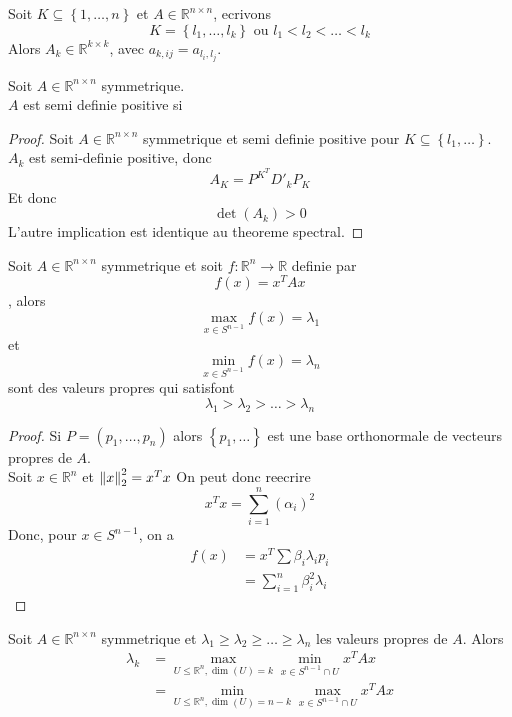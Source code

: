 \documentclass[../main.tex]{subfiles}
\begin{document}
\begin{defn}
Soit $K \subseteq \left\{ 1,\ldots,n \right\} $ et $A \in \mathbb{R}^{n\times n}$, ecrivons
\[ 
K = \left\{ l_1,\ldots, l_k \right\}  \text{ ou }  l_1 < l_2 < \ldots <l_k
\]
Alors $A_k \in \mathbb{R}^{k \times k}$, avec $a_{k,ij} = a_{l_i,l_j}  $.
\end{defn}
\begin{thm}
Soit $A \in \mathbb{R}^{n\times n}$ symmetrique.\\
$A$ est semi definie positive si 
\end{thm}
\begin{proof}
Soit $A \in \mathbb{R}^{n \times n} $ symmetrique et semi definie positive pour $K \subseteq \left\{ l_1,\ldots \right\} $.\\
$A_k$ est semi-definie positive, donc 
\[ 
A_K = P^{K^{T}} D'_k P_K
\]
Et donc
\[ 
	\det ( A_k) >0
\]
L'autre implication est identique au theoreme spectral.

\end{proof}
\begin{thm}
Soit $A \in \mathbb{R}^{n\times n}$ symmetrique et soit $f: \mathbb{R}^{n}\to \mathbb{R}$ definie par
\[ 
	f( x) = x^{T} A x
\]
, alors 
\[ 
	\max_{x \in S^{n-1}}  f(x)  = \lambda_1
\]
et
\[ 
	\min_{x \in S^{n-1}}  f(x)  = \lambda_n
\]
sont des valeurs propres qui satisfont
\[ 
\lambda_1 > \lambda_2 > \ldots > \lambda_n
\]


\end{thm}
\begin{proof}
	Si $P= ( p_1, \ldots, p_n) $ alors $ \left\{ p_1, \ldots \right\} $ est une base orthonormale de vecteurs propres de $A$. \\
	Soit $x \in \mathbb{R}^{n}$ et $ \left\lVert x\right\rVert _2^{2}=x^{T}x$ On peut donc reecrire
	\[ 
		x^{T}x = \sum_{i=1}^{ n} ( \alpha_i) ^{2}
	\]
	Donc, pour $x \in S^{n-1}$, on a
	\begin{align*}
		f( x) &= x^{T} \sum \beta_i \lambda_i p_i\\
		&= \sum_{i=1}^{ n}\beta_i ^{2} \lambda_i
	\end{align*}
	
	
\end{proof}
\begin{thm}
	Soit $A \in \mathbb{R}^{n\times n}$ symmetrique et $\lambda_1 \geq \lambda_2 \geq \ldots \geq \lambda_n$ les valeurs propres de $A$. Alors
	\begin{align*}
		\lambda_k &= \max_{U \leq \mathbb{R}^{n}, \dim( U) =k}\min_{x \in S^{n-1}\cap U}  x^{T}A x\\
			  &= \min_{U \leq  \mathbb{R}^{n}, \dim( U) = n-k }  \max_{x \in S^{n-1}\cap U}  x^{T} A x
	\end{align*}

\end{thm}
\end{document}
